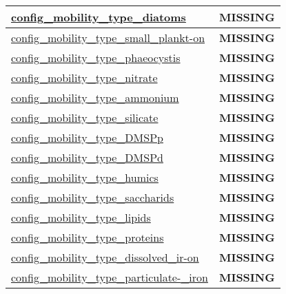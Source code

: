{\begin{center}
\begin{longtable}{| p{2.0in} || p{4.0in} |}
    \hline
    \hyperref[subsec:nm_sec_config_mobility_type_diatoms]{config\_mobility\_type\_diatoms} & {\bf \color{red} MISSING} \\
    \hline
    \hyperref[subsec:nm_sec_config_mobility_type_small_plankton]{config\_mobility\_type\_small\_plankt-}\hyperref[subsec:nm_sec_config_mobility_type_small_plankton]{on}& {\bf \color{red} MISSING} \\
    \hline
    \hyperref[subsec:nm_sec_config_mobility_type_phaeocystis]{config\_mobility\_type\_phaeocystis} & {\bf \color{red} MISSING} \\
    \hline
    \hyperref[subsec:nm_sec_config_mobility_type_nitrate]{config\_mobility\_type\_nitrate} & {\bf \color{red} MISSING} \\
    \hline
    \hyperref[subsec:nm_sec_config_mobility_type_ammonium]{config\_mobility\_type\_ammonium} & {\bf \color{red} MISSING} \\
    \hline
    \hyperref[subsec:nm_sec_config_mobility_type_silicate]{config\_mobility\_type\_silicate} & {\bf \color{red} MISSING} \\
    \hline
    \hyperref[subsec:nm_sec_config_mobility_type_DMSPp]{config\_mobility\_type\_DMSPp} & {\bf \color{red} MISSING} \\
    \hline
    \hyperref[subsec:nm_sec_config_mobility_type_DMSPd]{config\_mobility\_type\_DMSPd} & {\bf \color{red} MISSING} \\
    \hline
    \hyperref[subsec:nm_sec_config_mobility_type_humics]{config\_mobility\_type\_humics} & {\bf \color{red} MISSING} \\
    \hline
    \hyperref[subsec:nm_sec_config_mobility_type_saccharids]{config\_mobility\_type\_saccharids} & {\bf \color{red} MISSING} \\
    \hline
    \hyperref[subsec:nm_sec_config_mobility_type_lipids]{config\_mobility\_type\_lipids} & {\bf \color{red} MISSING} \\
    \hline
    \hyperref[subsec:nm_sec_config_mobility_type_proteins]{config\_mobility\_type\_proteins} & {\bf \color{red} MISSING} \\
    \hline
    \hyperref[subsec:nm_sec_config_mobility_type_dissolved_iron]{config\_mobility\_type\_dissolved\_ir-}\hyperref[subsec:nm_sec_config_mobility_type_dissolved_iron]{on}& {\bf \color{red} MISSING} \\
    \hline
    \hyperref[subsec:nm_sec_config_mobility_type_particulate_iron]{config\_mobility\_type\_particulate-}\hyperref[subsec:nm_sec_config_mobility_type_particulate_iron]{\_iron}& {\bf \color{red} MISSING} \\

\end{longtable}
\end{center}}
